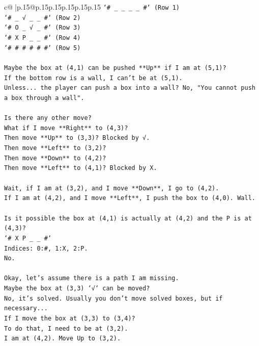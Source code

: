 \documentclass{article}
\begin{document}
{\begin{supertabular}{c@{$\;$}|p{.15\linewidth}@{}p{.15\linewidth}p{.15\linewidth}p{.15\linewidth}p{.15\linewidth}p{.15\linewidth}}
{{{\texttt{`\# \_ \_ \_ \_ \#` (Row 1)} \\
\texttt{`\# \_ √ \_ \_ \#` (Row 2)} \\
\texttt{`\# O \_ √ \_ \#` (Row 3)} \\
\texttt{`\# X P \_ \_ \#` (Row 4)} \\
\texttt{`\# \# \# \# \# \#` (Row 5)} \\
\\ 
\texttt{Maybe the box at (4,1) can be pushed **Up** if I am at (5,1)?} \\
\texttt{If the bottom row is a wall, I can't be at (5,1).} \\
\texttt{Unless... the player can push a box into a wall? No, "You cannot push a box through a wall".} \\
\\ 
\texttt{Is there any other move?} \\
\texttt{What if I move **Right** to (4,3)?} \\
\texttt{Then move **Up** to (3,3)? Blocked by √.} \\
\texttt{Then move **Left** to (3,2)?} \\
\texttt{Then move **Down** to (4,2)?} \\
\texttt{Then move **Left** to (4,1)? Blocked by X.} \\
\\ 
\texttt{Wait, if I am at (3,2), and I move **Down**, I go to (4,2).} \\
\texttt{If I am at (4,2), and I move **Left**, I push the box to (4,0). Wall.} \\
\\ 
\texttt{Is it possible the box at (4,1) is actually at (4,2) and the P is at (4,3)?} \\
\texttt{`\# X P \_ \_ \#`} \\
\texttt{Indices: 0:\#, 1:X, 2:P.} \\
\texttt{No.} \\
\\ 
\texttt{Okay, let's assume there is a path I am missing.} \\
\texttt{Maybe the box at (3,3) `√` can be moved?} \\
\texttt{No, it's solved. Usually you don't move solved boxes, but if necessary...} \\
\texttt{If I move the box at (3,3) to (3,4)?} \\
\texttt{To do that, I need to be at (3,2).} \\
\texttt{I am at (4,2). Move Up to (3,2).} \\
}}}
\end{supertabular}}
\end{document}
